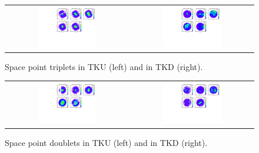\begin{figure}[ht]
	\centering
    \begin{tabular}{cc}
	    \includegraphics[width=0.5\textwidth]{Spacepoint_tripets_Up.pdf} &	
        \includegraphics[width=0.5\textwidth]{Spacepoint_Doublets_Up.pdf} \\
    \end{tabular}
	\caption{\label{SP_US}Space point triplets in TKU (left) and in TKD (right).}
\end{figure}

\begin{figure}[ht]
	\centering
    \begin{tabular}{cc}
	    \includegraphics[width=0.5\textwidth]{Spacepoint_tripets_Down.pdf} &	
        \includegraphics[width=0.5\textwidth]{Spacepoint_Doublets_Down.pdf} \\
    \end{tabular}
	\caption{\label{SP_DS}Space point doublets in TKU (left) and in TKD (right).}
\end{figure}

